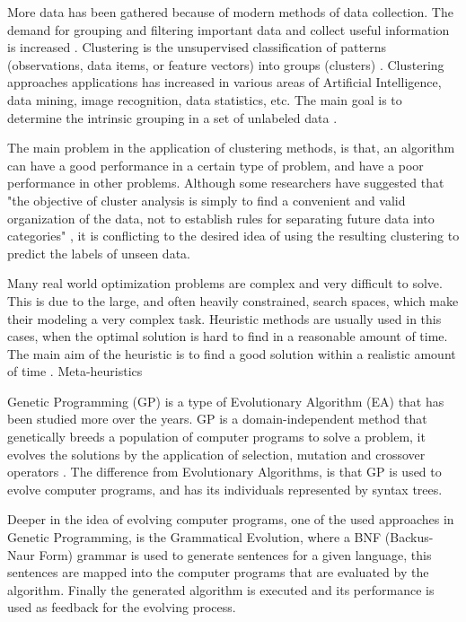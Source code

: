 \documentclass[journal]{IEEEtran}
\begin{document}
More data has been gathered because of modern methods of data collection. The demand for grouping and filtering important data and collect useful information is increased \cite{ahalya2015data}. Clustering is the unsupervised classification of patterns (observations, data items, or feature vectors) into groups (clusters) \cite{jain1988algorithms}. Clustering approaches applications has increased in various areas of Artificial Intelligence, data mining, image recognition, data statistics, etc. The main goal is to determine the intrinsic grouping in a set of unlabeled data \cite{ahalya2015data}.

The main problem in the application of clustering methods, is that, an algorithm can have a good performance in a certain type of problem, and have a poor performance in other problems. Although some researchers have suggested that "the objective of cluster analysis is simply to find a convenient and valid organization of the data, not to establish rules for separating future data into categories" \cite{jain1988algorithms}, it is conflicting to the desired idea of using the resulting clustering to predict the labels of unseen data.

Many real world optimization problems are complex and very difficult to solve. This is due to the large, and often heavily constrained, search spaces, which make their modeling a very complex task. Heuristic methods are usually used in this cases, when the optimal solution is hard to find in a reasonable amount of time. The main aim of the heuristic is to find a good solution within a realistic amount of time \cite{sabar2013grammatical}. Meta-heuristics

Genetic Programming (GP) is a type of Evolutionary Algorithm (EA) that has been studied more over the years. GP is a domain-independent method that genetically breeds a population of computer programs to solve a problem, it evolves the solutions by the application of selection, mutation and crossover operators \cite{poli2014genetic}. The difference from Evolutionary Algorithms, is that GP is used to evolve computer programs, and has its individuals represented by syntax trees.

Deeper in the idea of evolving computer programs, one of the used approaches in Genetic Programming, is the Grammatical Evolution, where a BNF (Backus-Naur Form) grammar is used to generate sentences for a given language, this sentences are mapped into the computer programs that are evaluated by the algorithm. Finally the generated algorithm is executed and its performance is used as feedback for the evolving process.
\end{document}
